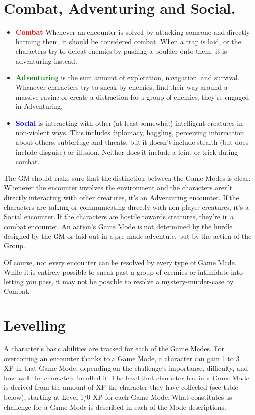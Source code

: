 \section{Combat, Adventuring and Social.}\label{sec:gameModes}
\begin{itemize}
	\item \textcolor{red}{\textbf{Combat}} Whenever an encounter is solved by attacking someone and directly harming them, it should be considered combat.
	When a trap is laid, or the characters try to defeat enemies by pushing a boulder onto them, it is adventuring instead.

	\item \textcolor{green}{\textbf{Adventuring}} is the sum amount of exploration, navigation, and survival.
	Whenever characters try to sneak by enemies, find their way around a massive ravine or create a distraction for a group of enemies, they're engaged in Adventuring.

	\item \textcolor{blue}{\textbf{Social}} is interacting with other (at least somewhat) intelligent creatures in non-violent ways.
	This includes diplomacy, haggling, perceiving information about others, subterfuge and threats, but ít doesn't include stealth (but does include disguise) or illusion. 
	Neither does it include a feint or trick during combat.
	
\end{itemize}

The GM should make sure that the distinction between the Game Modes is clear. 
Whenever the encounter involves the environment and the characters aren't directly interacting with other creatures, it's an Adventuring encounter. If the characters are talking or communicating directly with non-player creatures, it's a Social encounter. If the characters are hostile towards creatures, they're in a combat encounter. An action's Game Mode is not determined by the hurdle designed by the GM or laid out in a pre-made adventure, but by the action of the Group.

Of course, not every encounter can be resolved by every type of Game Mode. 
While it is entirely possible to sneak past a group of enemies or intimidate into letting you pass, it may not be possible to resolve a mystery-murder-case by Combat.

\section{Levelling}\label{sec:levelling}
A character’s basic abilities are tracked for each of the Game Modes. For overcoming an encounter thanks to a Game Mode, a character can gain 1 to 3 XP in that Game Mode, depending on the challenge’s importance, difficulty, and how well the characters handled it. The level that character has in a Game Mode is derived from the amount of XP the character they have collected (see table below), starting at Level 1/0 XP for each Game Mode. What constitutes as challenge for a Game Mode is described in each of the Mode descriptions.

